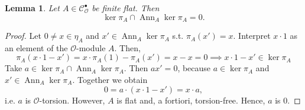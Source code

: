 \documentclass{article}
\theoremstyle{plain}%
\newtheorem{lemma}[theorem]{Lemma}
\theoremstyle{definition}
\theoremstyle{remark}
\newcommand{\cob}{\mathcal{C}_\mathcal{O}^\bullet}
\newcommand{\ann}{\operatorname{Ann}}
\begin{document}
\begin{lemma}\label{lem:intersectionzero}
    Let \(A \in \cob\) be finite flat. Then
    \[
        \ker \pi_A \cap \ann_A \ker \pi_A = 0.  
    \]
\end{lemma}
\begin{proof}
    Let \(0 \neq x \in \eta_A\) and \(x' \in \ann_A \ker \pi_A\) s.t. \(\pi_A(x') = x\).
    Interpret \(x \cdot 1\) as an element of the \(\mathcal{O}\)-module \(A\). Then,
    \[
        \pi_A(x \cdot 1 - x') = x\cdot \pi_A(1) - \pi_A(x') = x - x = 0 \implies x \cdot 1 - x' \in \ker \pi_A
    \]
    Take \(a \in \ker \pi_A \cap \ann_A \ker \pi_A\). Then \(ax' = 0\), because \(a\in \ker \pi_A\) 
    and \(x' \in \ann_A \ker \pi_A\). Together we obtain
    \[
        0 = a \cdot (x\cdot 1 - x') = x \cdot a,
    \]
    i.e. \(a\) is \(\mathcal{O}\)-torsion. However, \(A\) is flat and, a fortiori, torsion-free. Hence,
    \(a\) is 0.
\end{proof}
\end{document}

